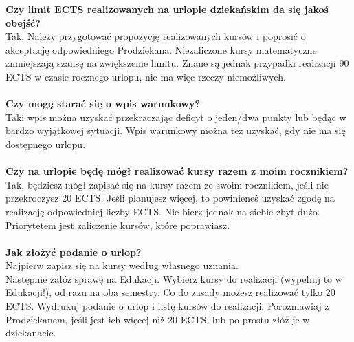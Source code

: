 \documentclass[11pt]{article}
\begin{document}
\textbf{Czy limit ECTS realizowanych na urlopie dziekańskim da się jakoś obejść?} \\
\indent Tak. Należy przygotować propozycję realizowanych kursów i poprosić o akceptację odpowiedniego Prodziekana. Niezaliczone kursy matematyczne zmniejszają szansę na zwiększenie limitu. Znane są jednak przypadki realizacji 90 ECTS w czasie rocznego urlopu, nie ma więc rzeczy niemożliwych. \\\\
\textbf{Czy mogę starać się o wpis warunkowy?} \\
\indent Taki wpis można uzyskać przekraczając deficyt o jeden/dwa punkty lub będąc w bardzo wyjątkowej sytuacji. Wpis warunkowy można też uzyskać, gdy nie ma się dostępnego urlopu. \\\\
\textbf{Czy na urlopie będę mógł realizować kursy razem z moim rocznikiem?} \\
\indent Tak, będziesz mógł zapisać się na kursy razem ze swoim rocznikiem, jeśli nie przekroczysz 20 ECTS. Jeśli planujesz więcej, to powinieneś uzyskać zgodę na realizację odpowiedniej liczby ECTS. Nie bierz jednak na siebie zbyt dużo. Priorytetem jest zaliczenie kursów, które poprawiasz. \\\\
\textbf{Jak złożyć podanie o urlop?} \\
\indent Najpierw zapisz się na kursy według własnego uznania. \\
\indent Następnie załóż sprawę na Edukacji. Wybierz kursy do realizacji (wypełnij to w Edukacji!), od razu na oba semestry. Co do zasady możesz realizować tylko 20 ECTS. Wydrukuj podanie o urlop i listę kursów do realizacji. Porozmawiaj z Prodziekanem, jeśli jest ich więcej niż 20 ECTS, lub po prostu złóż je w dziekanacie.
\end{document}
